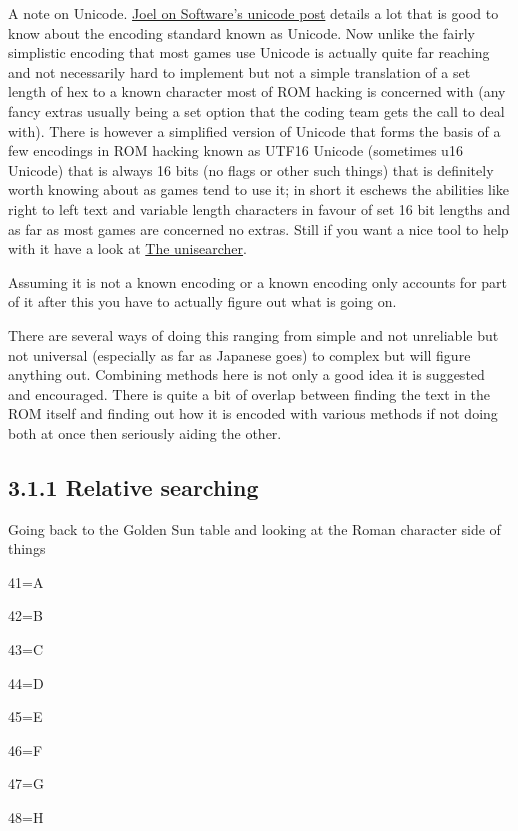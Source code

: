 \documentclass[
]{book}
\begin{document}
A note on Unicode. \href{http://www.joelonsoftware.com/articles/Unicode.html}{Joel on Software's unicode post} details a lot that is good to know about the encoding standard known as Unicode. Now unlike the fairly simplistic encoding that most games use Unicode is actually quite far reaching and not necessarily hard to implement but not a simple translation of a set length of hex to a known character most of ROM hacking is concerned with (any fancy extras usually being a set option that the coding team gets the call to deal with). There is however a simplified version of Unicode that forms the basis of a few encodings in ROM hacking known as UTF16 Unicode (sometimes u16 Unicode) that is always 16 bits (no flags or other such things) that is definitely worth knowing about as games tend to use it; in short it eschews the abilities like right to left text and variable length characters in favour of set 16 bit lengths and as far as most games are concerned no extras. Still if you want a nice tool to help with it have a look at \href{http://www.isthisthingon.org/unicode/index.phtml}{The unisearcher}.

Assuming it is not a known encoding or a known encoding only accounts for part of it after this you have to actually figure out what is going on.

There are several ways of doing this ranging from simple and not unreliable but not universal (especially as far as Japanese goes) to complex but will figure anything out. Combining methods here is not only a good idea it is suggested and encouraged. There is quite a bit of overlap between finding the text in the ROM itself and finding out how it is encoded with various methods if not doing both at once then seriously aiding the other.

\hypertarget{relative-searching}{%
\subsection{3.1.1 Relative searching}\label{relative-searching}}

Going back to the Golden Sun table and looking at the Roman character side of things

41=A

42=B

43=C

44=D

45=E

46=F

47=G

48=H
\end{document}
